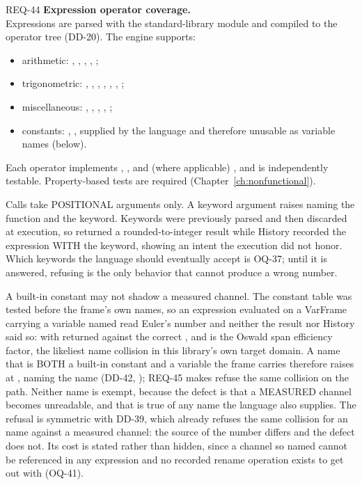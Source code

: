 \begin{reqbox}{REQ-44}{\stable}
\textbf{Expression operator coverage.}\\
Expressions are parsed with the standard-library  module and
compiled to the \itc{} operator tree (DD-20). The engine supports:
\begin{itemize}[noitemsep,topsep=2pt]
  \item arithmetic: \code{+}, \code{-}, \code{*}, \code{/}, \code{**};
  \item trigonometric: , , , ,
    , , ;
  \item miscellaneous: , , , ,
    ;
  \item constants: , , supplied by the language and
    therefore unusable as variable names (below).
\end{itemize}
Each operator implements , , and (where
applicable) , and is independently testable. Property-based
tests are required (Chapter~\ref{ch:nonfunctional}).

Calls take POSITIONAL arguments only. A keyword argument raises
 naming the function and the keyword. Keywords were
previously parsed and then discarded at execution, so
 returned a rounded-to-integer result
while History recorded the expression WITH the keyword, showing an
intent the execution did not honor. Which keywords the language should
eventually accept is OQ-37; until it is answered, refusing is the only
behavior that cannot produce a wrong number.

A built-in constant may not shadow a measured channel. The constant
table was tested before the frame's own names, so an expression
evaluated on a VarFrame carrying a variable named  read Euler's
number and neither the result nor History said so:  with  returned  against
the correct , and  is the Oswald span
efficiency factor, the likeliest name collision in this library's own
target domain. A name that is BOTH a built-in constant and a variable
the frame carries therefore raises  at ,
naming the name (DD-42, ); REQ-45 makes
 refuse the same collision on the 
path. Neither name is exempt, because the defect is that a MEASURED
channel becomes unreadable, and that is true of any name the language
also supplies. The refusal is symmetric with DD-39, which already
refuses the same collision for an  \code{[constants]} name
against a measured channel: the source of the number differs and the
defect does not. Its cost is stated rather than hidden, since a channel
so named cannot be referenced in any expression and no recorded rename
operation exists to get out with (OQ-41).
\end{reqbox}

